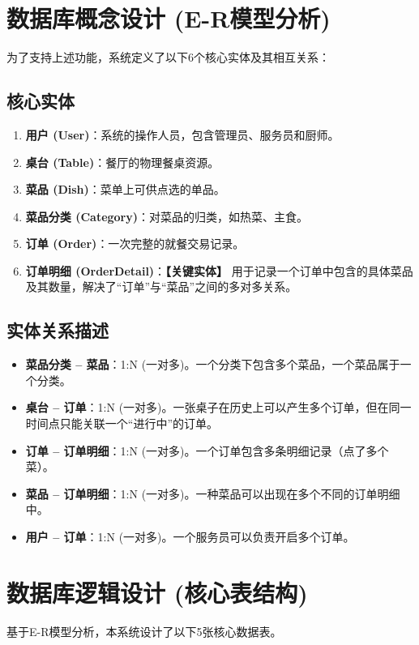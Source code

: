 \documentclass[11pt, a4paper]{article}
\begin{document}
\section{数据库概念设计 (E-R模型分析)}
为了支持上述功能，系统定义了以下6个核心实体及其相互关系：

\subsection{核心实体}
\begin{enumerate}
    \item \textbf{用户 (User)}：系统的操作人员，包含管理员、服务员和厨师。
    \item \textbf{桌台 (Table)}：餐厅的物理餐桌资源。
    \item \textbf{菜品 (Dish)}：菜单上可供点选的单品。
    \item \textbf{菜品分类 (Category)}：对菜品的归类，如热菜、主食。
    \item \textbf{订单 (Order)}：一次完整的就餐交易记录。
    \item \textbf{订单明细 (OrderDetail)}：\textbf{【关键实体】} 用于记录一个订单中包含的具体菜品及其数量，解决了“订单”与“菜品”之间的多对多关系。
\end{enumerate}

\subsection{实体关系描述}
\begin{itemize}
    \item \textbf{菜品分类 -- 菜品}：1:N (一对多)。一个分类下包含多个菜品，一个菜品属于一个分类。
    \item \textbf{桌台 -- 订单}：1:N (一对多)。一张桌子在历史上可以产生多个订单，但在同一时间点只能关联一个“进行中”的订单。
    \item \textbf{订单 -- 订单明细}：1:N (一对多)。一个订单包含多条明细记录（点了多个菜）。
    \item \textbf{菜品 -- 订单明细}：1:N (一对多)。一种菜品可以出现在多个不同的订单明细中。
    \item \textbf{用户 -- 订单}：1:N (一对多)。一个服务员可以负责开启多个订单。
\end{itemize}

\section{数据库逻辑设计 (核心表结构)}
基于E-R模型分析，本系统设计了以下5张核心数据表。
\end{document}
